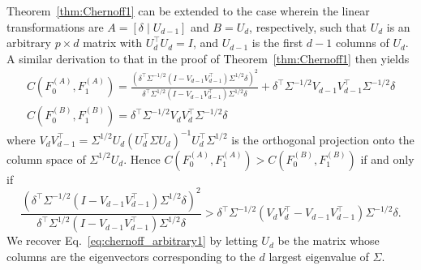 \documentclass[11pt]{extarticle}
\begin{document}
\begin{remark}
Theorem~\ref{thm:Chernoff1} can be extended to the case wherein the linear transformations are $A = [\delta \mid U_{d-1}]$ and $B = U_d$, respectively, such that
$U_{d}$ is an arbitrary $p \times d$ matrix with $U_{d}^{\top} U_d = I$, and $U_{d-1}$ is the first $d-1$ columns of $U_d$.
A similar derivation to that in the proof of Theorem~\ref{thm:Chernoff1} then yields
 \begin{gather}
 C(F_0^{(A)}, F_1^{(A)}) = \frac{(\delta^{\top} \Sigma^{-1/2} (I - V_{d-1} V_{d-1}^{\top}) \Sigma^{1/2} \delta)^2}{\delta^{\top} \Sigma^{1/2} (I - V_{d-1} V_{d-1}^{\top}) \Sigma^{1/2} \delta} + \delta^{\top} \Sigma^{-1/2} V_{d-1} V_{d-1}^{\top} \Sigma^{-1/2} \delta \\
 C(F_0^{(B)}, F_1^{(B)}) = \delta^{\top} \Sigma^{-1/2} V_d V_d^{\top} \Sigma^{-1/2} \delta
 \end{gather}
 where $V_{d} V_{d-1}^{\top} = \Sigma^{1/2} U_d (U_d^{\top} \Sigma U_d)^{-1} U_d^{\top} \Sigma^{1/2}$ is the orthogonal projection onto the column space of $\Sigma^{1/2} U_d$. Hence $C(F_0^{(A)}, F_1^{(A)}) > C(F_0^{(B)}, F_1^{(B)})$ if and only if
 \begin{equation}
 \label{eq:general1}
 \frac{(\delta^{\top} \Sigma^{-1/2} (I - V_{d-1} V_{d-1}^{\top}) \Sigma^{1/2} \delta)^2}{\delta^{\top} \Sigma^{1/2} (I - V_{d-1} V_{d-1}^{\top}) \Sigma^{1/2} \delta} > \delta^{\top} \Sigma^{-1/2} (V_d V_d^{\top} - V_{d-1} V_{d-1}^{\top}) \Sigma^{-1/2} \delta.
 \end{equation}
We recover Eq.~\ref{eq:chernoff_arbitrary1}
by letting $U_d$ be the matrix whose columns are the eigenvectors corresponding to the $d$ largest eigenvalue of $\Sigma$.
\end{remark}
\end{document}
